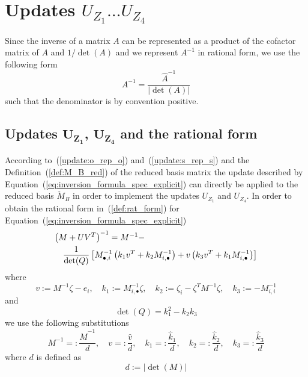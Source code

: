 \documentclass[a4paper]{article}
\begin{document}
\section{Updates $U_{Z_{1}} \dots U_{Z_{4}}$}
Since the inverse of a matrix $A$ can be represented as a product of the
cofactor matrix of $A$ and $1/\det(A)$ and we represent $A^{-1}$ in rational
form, we use the following form 
\begin{equation}
\label{def:rat_form}
A^{-1}=\frac{\hat{A}^{-1}}{\left|\det\left(A\right)\right|}
\end{equation}
such that the denominator is by convention positive.

\subsection{Updates $\mathbf{U_{Z_{1}}}$, $\mathbf{U_{Z_{4}}}$ and the rational form}
According to~(\ref{update:o_rep_o}) and~(\ref{update:s_rep_s})
and the Definition~(\ref{def:M_B_red}) of the reduced basis matrix
the update described by Equation~(\ref{eq:inversion_formula_spec_explicit})
can directly be applied to the reduced basis $\check{M}_{B}$
in order to implement
the updates $U_{Z_{1}}$ and $U_{Z_{4}}$. In order to obtain the rational form
in~(\ref{def:rat_form}) for Equation~(\ref{eq:inversion_formula_spec_explicit})
\begin{eqnarray}
\label{def:update_Z1_Z4}
\lefteqn{\left(M+ UV^{T}\right)^{-1}=M^{-1} -} \nonumber \\
& & \frac{1}{\det(Q)}
\left[
  M^{-1}_{\bullet, i}
  \left(k_{1}v^{T} + k_{2}M^{-1}_{i, \bullet}\right)
  +v\left(k_{3}v^{T} + k_{1}M^{-1}_{i, \bullet}\right)
\right]
\end{eqnarray}
where
\begin{equation}
\label{def:update_Z1_Z4_entities}
v:= M^{-1}\zeta-e_{i},
\quad
k_{1}:=M_{i, \bullet}^{-1}\zeta,
\quad
k_{2}:=\zeta_{i} - \zeta^{T}M^{-1}\zeta,
\quad
k_{3}:=-M_{i,i}^{-1}
\end{equation}
and
\begin{equation}
\label{eq:det(Q)}
\det(Q)=k_{1}^{2}-k_{2}k_{3}
\end{equation}
we use the following substitutions
\begin{equation}
M^{-1}=:\frac{\hat{M}^{-1}}{d},
\quad
v=:\frac{\hat{v}}{d},
\quad
k_{1}=:\frac{\hat{k}_{1}}{d},
\quad
k_{2}=:\frac{\hat{k}_{2}}{d},
\quad
k_{3}=:\frac{\hat{k}_{3}}{d}
\end{equation}
where $d$ is defined as
\begin{equation}
\label{def:old_denom_Z1_Z4}
d:=\left|\det(M)\right|
\end{equation}
\end{document}

